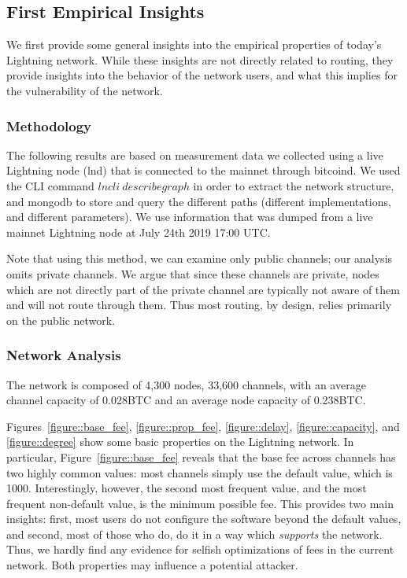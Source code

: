 \subsection{First Empirical Insights}

We first provide some general insights into the empirical
properties of today's Lightning network.
While these insights are not directly related to 
routing, they provide insights into the behavior
of the network users, and what this implies
for the vulnerability of the network.

\subsubsection{Methodology}

The following results are based on measurement data we collected using 
a live Lightning node (lnd) 
that is connected to the mainnet through bitcoind.
We used the CLI command $lncli~ describegraph$ in order to extract the network structure,
and mongodb to store and query the different paths (different implementations, and different parameters).
We use information that was dumped from a live mainnet Lightning node at July 24th 2019 17:00 UTC.

Note that using this method, we can examine only public channels;
our analysis omits private channels.
We argue that since these channels are private,  nodes which are not directly part of the private channel are typically not aware of them and will not route through them. 
Thus most routing, by design, relies primarily on the public network.

\subsubsection{Network Analysis}

    The network is composed of
    4,300 nodes, 33,600 channels, 
    with an average channel capacity of 0.028BTC and an average node capacity of 0.238BTC.
    
    
    Figures~\ref{figure::base_fee}, \ref{figure::prop_fee}, \ref{figure::delay}, \ref{figure::capacity}, and \ref{figure::degree} show some basic properties on the Lightning network.
    In particular, Figure~\ref{figure::base_fee} reveals that the base fee across channels has two highly common values:
    most channels simply use the default value, which is 1000.
    Interestingly, however, the second most frequent value,
    and the most frequent non-default value, is the minimum possible fee.
    This provides two main insights: first,  most
    users do not configure the software beyond the default values,
    and second, most of those who do, do it in a way which \emph{supports} the network.
    Thus, we hardly find any evidence for selfish optimizations of fees in the current network.
    Both properties may influence a potential attacker.
    
